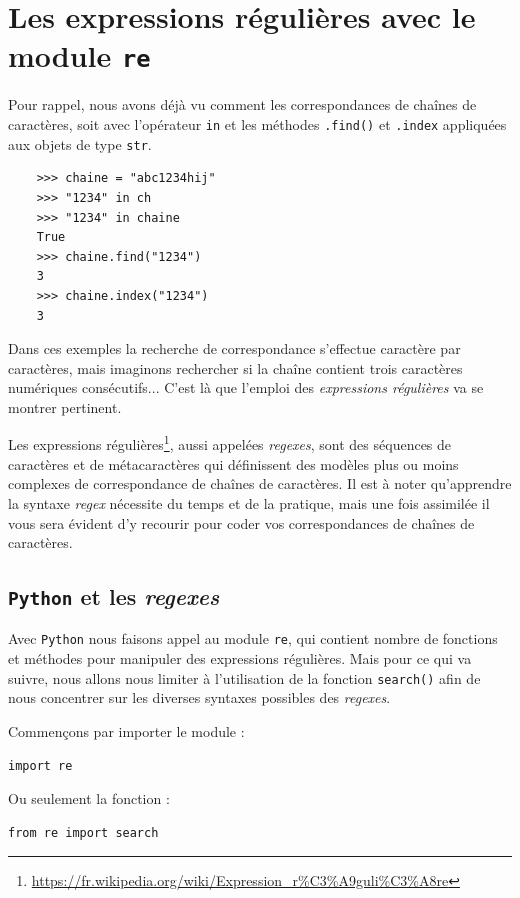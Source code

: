 \documentclass[a4paper,12pt]{book}
\begin{document}
\chapter{Les expressions régulières avec le module \texttt{re}}
Pour rappel, nous avons déjà vu comment les correspondances de chaînes de caractères, soit avec l'opérateur \texttt{in} et les méthodes \texttt{.find()} et \texttt{.index} appliquées aux objets de type \texttt{str}.
\begin{verbatim}
    >>> chaine = "abc1234hij"
    >>> "1234" in ch
    >>> "1234" in chaine
    True
    >>> chaine.find("1234")
    3
    >>> chaine.index("1234")
    3
\end{verbatim}
\medskip

Dans ces exemples la recherche de correspondance s'effectue caractère par caractères, mais imaginons rechercher si la chaîne contient trois caractères numériques consécutifs... C'est là que l'emploi des \textit{expressions régulières} va se montrer pertinent. 
\medskip

Les expressions régulières\footnote{\url{https://fr.wikipedia.org/wiki/Expression_r\%C3\%A9guli\%C3\%A8re}}, aussi appelées \textit{regexes}, sont des séquences de caractères et de métacaractères qui définissent des modèles plus ou moins complexes de correspondance de chaînes de caractères. Il est à noter qu'apprendre la  syntaxe \textit{regex} nécessite du temps et de la pratique, mais une fois assimilée il vous sera évident d'y recourir pour coder vos correspondances de chaînes de caractères. 
\medskip

\section{\texttt{Python} et les \textit{regexes}}
Avec \texttt{Python} nous faisons appel au module \texttt{re}, qui contient nombre de fonctions et méthodes pour manipuler des expressions régulières. Mais pour ce qui va suivre, nous allons nous limiter à l'utilisation de la fonction \texttt{search()} afin de nous concentrer sur les diverses syntaxes possibles des \textit{regexes}.
\medskip

Commençons par importer le module :
\begin{lstlisting}
import re
\end{lstlisting}
\medskip

Ou seulement la fonction :
\begin{lstlisting}
from re import search
\end{lstlisting}
\medskip
\end{document}
